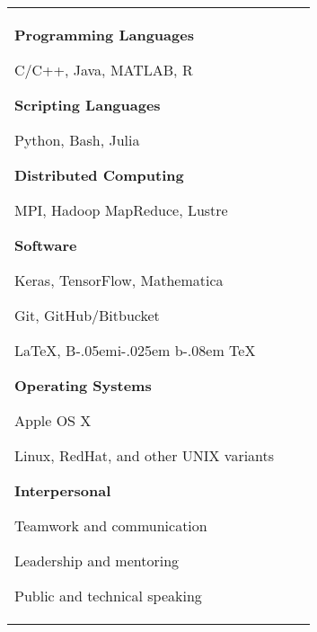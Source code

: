 \documentclass[10pt]{article}
\providecommand\BibTeX{{B\kern-.05em{\sc i\kern-.025em b}\kern-.08em \TeX}}
\begin{document}
\begin{tabular}[t]{@{}p{\textwidth-\rcollength-3.5\spacewidth}@{}p{\spacewidth}@{}p{\rcollength}}
\parbox{\textwidth-\rcollength-\spacewidth}{%
\textbf{Programming Languages}
\begin{innerlist}
	\item[] C/C++, Java, MATLAB, R
\end{innerlist}
%
\textbf{Scripting Languages}
\begin{innerlist}
	\item[] Python, Bash, Julia
\end{innerlist}
%
\textbf{Distributed Computing}
\begin{innerlist}
	\item[] MPI, Hadoop MapReduce, Lustre
\end{innerlist}
%
\textbf{Software}
\begin{innerlist}
	\item[] Keras, TensorFlow, Mathematica
	\item[] Git, GitHub/Bitbucket
	\item[] \LaTeX{}, \BibTeX
\end{innerlist}
%
\textbf{Operating Systems}
\begin{innerlist}
    \item[] Apple OS X
    \item[] Linux, RedHat, and other UNIX variants
\end{innerlist}
%
\textbf{Interpersonal}
\begin{innerlist}
	\item[] Teamwork and communication
	\item[] Leadership and mentoring
	\item[] Public and technical speaking
\end{innerlist}
}


\end{tabular}
\end{document}
